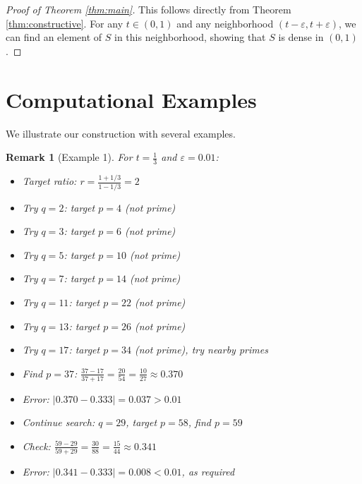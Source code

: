 \documentclass[11pt]{article}
\newtheorem{remark}{Remark}
\begin{document}
\begin{proof}[Proof of Theorem \ref{thm:main}]
This follows directly from Theorem \ref{thm:constructive}. For any $t \in (0,1)$ and any neighborhood $(t-\varepsilon, t+\varepsilon)$, we can find an element of $S$ in this neighborhood, showing that $S$ is dense in $(0,1)$.
\end{proof}

\section{Computational Examples}

We illustrate our construction with several examples.

\begin{remark}[Example 1]
For $t = \frac{1}{3}$ and $\varepsilon = 0.01$:
\begin{itemize}
\item Target ratio: $r = \frac{1 + 1/3}{1 - 1/3} = 2$
\item Try $q = 2$: target $p = 4$ (not prime)
\item Try $q = 3$: target $p = 6$ (not prime)  
\item Try $q = 5$: target $p = 10$ (not prime)
\item Try $q = 7$: target $p = 14$ (not prime)
\item Try $q = 11$: target $p = 22$ (not prime)
\item Try $q = 13$: target $p = 26$ (not prime)
\item Try $q = 17$: target $p = 34$ (not prime), try nearby primes
\item Find $p = 37$: $\frac{37-17}{37+17} = \frac{20}{54} = \frac{10}{27} \approx 0.370$
\item Error: $|0.370 - 0.333| = 0.037 > 0.01$
\item Continue search: $q = 29$, target $p = 58$, find $p = 59$
\item Check: $\frac{59-29}{59+29} = \frac{30}{88} = \frac{15}{44} \approx 0.341$
\item Error: $|0.341 - 0.333| = 0.008 < 0.01$, as required
\end{itemize}
\end{remark}
\end{document}
